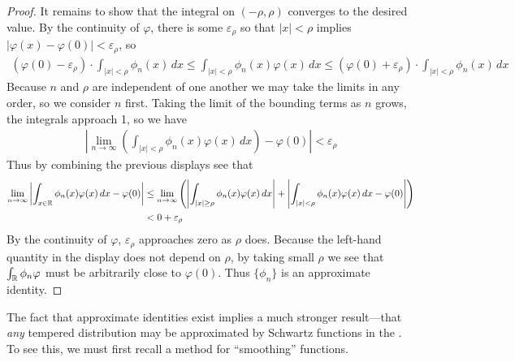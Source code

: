 \begin{proof}
      It remains to show that the integral on $(-\rho,\rho)$ converges to the desired value.
      By the continuity of $\varphi$, there is some $\varepsilon_\rho$ so that $|x|<\rho$ implies $|\varphi(x)-\varphi(0)|<\varepsilon_\rho$, so
      \begin{align*}
        (\varphi(0)-\varepsilon_\rho)\cdot \int_{|x|<\rho} \phi_n(x)\,dx
        \le \int_{|x|<\rho} \phi_n(x)\varphi(x)\,dx
        \le (\varphi(0)+\varepsilon_\rho)\cdot \int_{|x|<\rho} \phi_n(x)\, dx
      \end{align*}
      Because $n$ and $\rho$ are independent of one another we may take the limits in any order, so we consider $n$ first.
      Taking the limit of the bounding terms as $n$ grows, the integrals approach 1, so we have
      \begin{align*}
        \left| \lim_{n\rightarrow\infty}\left(\int_{|x|<\rho} \phi_n(x)\varphi(x)\,dx\right) - \varphi(0) \right|
        < \varepsilon_\rho
      \end{align*}
      Thus by combining the previous displays see that 
      \begin{align*}
        \lim_{n\rightarrow\infty}\left| \int_{x\in\mathbb{R}} \phi_n(x)\varphi(x)\,dx -\varphi(0)\right|
        &\le \lim_{n\rightarrow\infty} \left( \left| \int_{|x|\ge\rho} \phi_n(x)\varphi(x)\,dx \right|
        + \left| \int_{|x|<\rho} \phi_n(x)\varphi(x)\,dx -\varphi(0)\right| \right)
        \\&< 0 + \varepsilon_\rho
      \end{align*}
      By the continuity of $\varphi$, $\varepsilon_\rho$ approaches zero as $\rho$ does.
      Because the left-hand quantity in the display does not depend on $\rho$, by taking small $\rho$ we see that $\int_\mathbb{R} \phi_n\varphi$ must be arbitrarily close to $\varphi(0)$.
      Thus $\{\phi_n\}$ is an approximate identity.
    \end{proof}

    The fact that approximate identities exist implies a much stronger result---that \emph{any} tempered distribution may be approximated by Schwartz functions in the \ws.
    To see this, we must first recall a method for ``smoothing'' functions.

